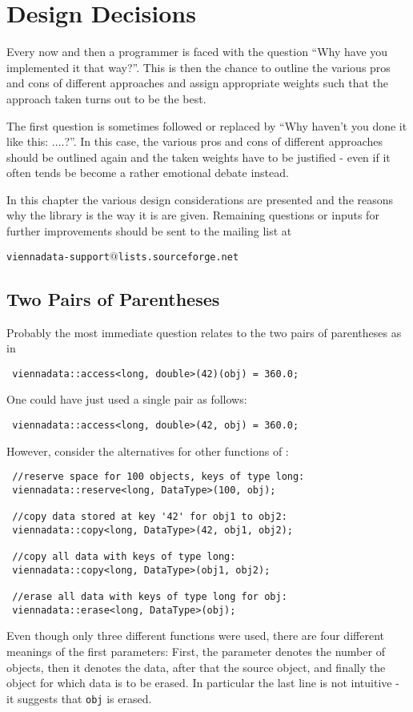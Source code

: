 \chapter{Design Decisions} \label{chap:design}

Every now and then a programmer is faced with the question ``Why have you implemented it that way?''.
This is then the chance to outline the various pros and cons of different approaches and assign appropriate weights such that the approach taken turns out to be the best.

The first question is sometimes followed or replaced by ``Why haven't you done it like this: ....?''.
In this case, the various pros and cons of different approaches should be outlined again and the taken weights have to be justified - even if it often tends be become a rather emotional debate instead.

In this chapter the various design considerations are presented and the reasons why the library is the way it is are given.
Remaining questions or inputs for further improvements should be sent to the mailing list at
\begin{center}
\texttt{viennadata-support$@$lists.sourceforge.net} 
\end{center}

\section{Two Pairs of Parentheses}
Probably the most immediate question relates to the two pairs of parentheses as in
\begin{lstlisting}
 viennadata::access<long, double>(42)(obj) = 360.0;
\end{lstlisting}
One could have just used a single pair as follows:
\begin{lstlisting}
 viennadata::access<long, double>(42, obj) = 360.0;
\end{lstlisting}
However, consider the alternatives for other functions of {\ViennaData}:
\begin{lstlisting}
 //reserve space for 100 objects, keys of type long:
 viennadata::reserve<long, DataType>(100, obj);

 //copy data stored at key '42' for obj1 to obj2:
 viennadata::copy<long, DataType>(42, obj1, obj2);

 //copy all data with keys of type long:
 viennadata::copy<long, DataType>(obj1, obj2);

 //erase all data with keys of type long for obj:
 viennadata::erase<long, DataType>(obj);
\end{lstlisting}
Even though only three different functions were used, there are four different meanings of the first parameters:
First, the parameter denotes the number of objects, then it denotes the data, after that the source object, and finally the object for which data is to be erased.
In particular the last line is not intuitive - it suggests that \lstinline|obj| is erased.

